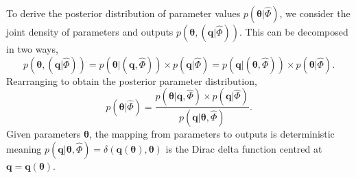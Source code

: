 To derive the posterior distribution of parameter values $p(\boldsymbol{\theta}|\hat{\Phi})$, we consider the joint density of parameters and outputs $p(\boldsymbol{\theta},(\boldsymbol{q}|\hat{\Phi}))$. This can be decomposed in two ways,
%
\begin{equation}\label{eq:joint}
  p( \boldsymbol{\theta}, (\boldsymbol{q}|\hat{\Phi}) )
= p( \boldsymbol{\theta}|(\boldsymbol{q}, \hat{\Phi}) ) \times p(\boldsymbol{q}|\hat{\Phi}) 
= p( \boldsymbol{q}|(\boldsymbol{\theta}, \hat{\Phi}) ) \times p(\boldsymbol{\theta}|\hat{\Phi}).
\end{equation}
%
Rearranging to obtain the posterior parameter distribution,
%
\begin{equation}
p(\boldsymbol{\theta}|\hat{\Phi}) 
= \frac{p(\boldsymbol{\theta}|\boldsymbol{q}, \hat{\Phi}) \times p(\boldsymbol{q}|\hat{\Phi})}{p(\boldsymbol{q}| \boldsymbol{\theta}, \hat{\Phi})}.
\end{equation}
%
Given parameters $\boldsymbol{\theta}$, the mapping from parameters to outputs is deterministic meaning 
$p(\boldsymbol{q}| \boldsymbol{\theta}, \hat{\Phi})=\delta(\boldsymbol{q}(\boldsymbol{\theta}),\boldsymbol{\theta})$ is the Dirac delta function centred at $\boldsymbol{q}=\boldsymbol{q}(\boldsymbol{\theta})$. 


